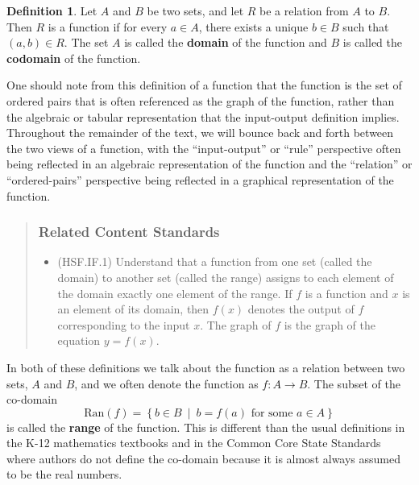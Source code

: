 \documentclass[
]{book}
\providecommand{\tightlist}{%
  \setlength{\itemsep}{0pt}\setlength{\parskip}{0pt}}
\theoremstyle{definition}
\newtheorem{definition}{Definition}[chapter]
\theoremstyle{definition}
\theoremstyle{definition}
\theoremstyle{remark}
\begin{document}
\begin{definition}
\protect\hypertarget{def:unnamed-chunk-125}{}{\label{def:unnamed-chunk-125} }Let \(A\) and \(B\) be two sets, and let \(R\) be a relation from \(A\) to \(B\). Then \(R\) is a function if for every \(a\in A\), there exists a unique \(b\in B\) such that \((a,b)\in R\). The set \(A\) is called the \textbf{domain} of the function and \(B\) is called the \textbf{codomain} of the function.
\end{definition}

One should note from this definition of a function that the function is the set of ordered pairs that is often referenced as the graph of the function, rather than the algebraic or tabular representation that the input-output definition implies. Throughout the remainder of the text, we will bounce back and forth between the two views of a function, with the ``input-output'' or ``rule'' perspective often being reflected in an algebraic representation of the function and the ``relation'' or ``ordered-pairs'' perspective being reflected in a graphical representation of the function.

\begin{quote}
\hypertarget{related-content-standards-22}{%
\subsubsection*{Related Content Standards}\label{related-content-standards-22}}

\begin{itemize}
\tightlist
\item
  (HSF.IF.1) Understand that a function from one set (called the domain) to another set (called the range) assigns to each element of the domain exactly one element of the range. If \(f\) is a function and \(x\) is an element of its domain, then \(f(x)\) denotes the output of \(f\) corresponding to the input \(x\). The graph of \(f\) is the graph of the equation \(y = f(x)\).
\end{itemize}
\end{quote}

In both of these definitions we talk about the function as a relation between two sets, \(A\) and \(B\), and we often denote the function as \(f:A \rightarrow B\). The subset of the co-domain \[\mbox{Ran}(f)=\left\{b\in B \: \middle \vert  \: b=f(a) \mbox{ for some } a \in A\right\}\] is called the \textbf{range} of the function. This is different than the usual definitions in the K-12 mathematics textbooks and in the Common Core State Standards where authors do not define the co-domain because it is almost always assumed to be the real numbers.
\end{document}
